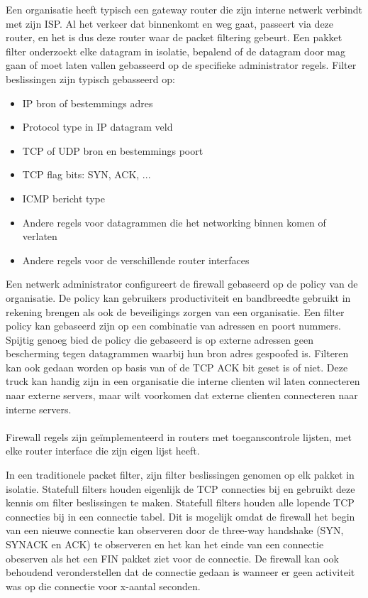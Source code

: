 Een organisatie heeft typisch een gateway router die zijn interne netwerk verbindt met zijn ISP. Al het verkeer dat binnenkomt en weg gaat, passeert via deze router, en het is dus deze router waar de packet filtering gebeurt. Een pakket filter onderzoekt elke datagram in isolatie, bepalend of de datagram door mag gaan of moet laten vallen gebasseerd op de specifieke administrator regels. Filter beslissingen zijn typisch gebasseerd op:
\begin{itemize}
\item IP bron of bestemmings adres
\item Protocol type in IP datagram veld
\item TCP of UDP bron en bestemmings poort
\item TCP flag bits: SYN, ACK, ...
\item ICMP bericht type
\item Andere regels voor datagrammen die het networking binnen komen of verlaten
\item Andere regels voor de verschillende router interfaces
\end{itemize}
Een netwerk administrator configureert de firewall gebaseerd op de policy van de organisatie. De policy kan gebruikers productiviteit en bandbreedte gebruikt in rekening brengen als ook de beveiligings zorgen van een organisatie. Een filter policy kan gebaseerd zijn op een combinatie van adressen en poort nummers. Spijtig genoeg bied de policy die gebaseerd is op externe adressen geen bescherming tegen datagrammen waarbij hun bron adres gespoofed is.
Filteren kan ook gedaan worden op basis van of de TCP ACK bit geset is of niet. Deze truck kan handig zijn in een organisatie die interne clienten wil laten connecteren naar externe servers, maar wilt voorkomen dat externe clienten connecteren naar interne servers.
\\\\
Firewall regels zijn geïmplementeerd in routers met toeganscontrole lijsten, met elke router interface die zijn eigen lijst heeft.


In een traditionele packet filter, zijn filter beslissingen genomen op elk pakket in isolatie. Statefull filters houden eigenlijk de TCP connecties bij en gebruikt deze kennis om filter beslissingen te maken.
Statefull filters houden alle lopende TCP connecties bij in een connectie tabel. Dit is mogelijk omdat de firewall het begin van een nieuwe connectie kan observeren door de three-way handshake (SYN, SYNACK en ACK) te observeren en het kan het einde van een connectie obeserven als het een FIN pakket ziet voor de connectie. De firewall kan ook behoudend veronderstellen dat de connectie gedaan is wanneer er geen activiteit was op die connectie voor x-aantal seconden.

